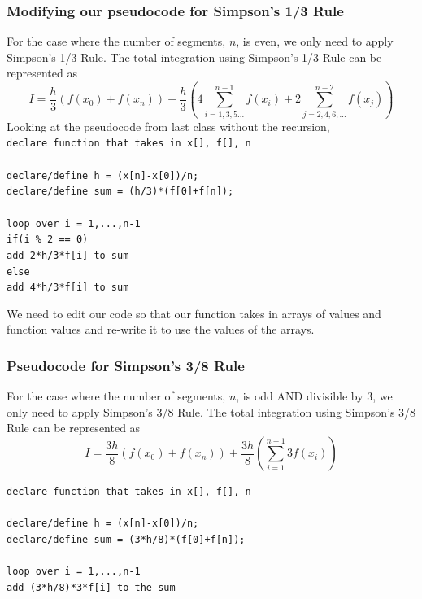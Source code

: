 \documentclass{if-beamer}
\begin{document}
\begin{frame}
	\frametitle{Modifying our pseudocode for Simpson's 1/3 Rule}
	For the case where the number of segments, $n$, is even, we only need to apply Simpson's 1/3 Rule. The total integration using Simpson's 1/3 Rule can be represented as
	$$I = \frac{h}{3}(f(x_0)+f(x_n))+\frac{h}{3}\left( 4\sum_{i = 1,3,5...}^{n-1}f(x_i) + 2\sum_{j = 2,4,6,...}^{n-2} f(x_j) \right)$$
	Looking at the pseudocode from last class without the recursion, \\\vspace{5pt}
	\texttt{declare function that takes in x[], f[], n}\\
	\texttt{ }\\
	\texttt{declare/define h = (x[n]-x[0])/n;}\\
	\texttt{declare/define sum = (h/3)*(f[0]+f[n]);}\\
	\texttt{ }\\
	\texttt{loop over i = 1,...,n-1 }\\
	\texttt{\qquad if(i \% 2 == 0)}\\
	\texttt{\qquad \qquad add 2*h/3*f[i] to sum} \\
	\texttt{\qquad else}\\
	\texttt{\qquad \qquad add 4*h/3*f[i] to sum}
	\texttt{ } \\\vspace{5pt}
	
	We need to edit our code so that our function takes in arrays of  values and function values and re-write it to use the values of the arrays.  
\end{frame}

\begin{frame}
	\frametitle{Pseudocode for Simpson's 3/8 Rule}
	For the case where the number of segments, $n$, is odd AND divisible by 3, we only need to apply Simpson's 3/8 Rule. The total integration using Simpson's 3/8 Rule can be represented as
	$$I = \frac{3h}{8}(f(x_0)+f(x_n))+\frac{3h}{8}\left( \sum_{i = 1}^{n-1}3f(x_i) \right)$$
	
	\texttt{declare function that takes in x[], f[], n}\\
	\texttt{ }\\
	\texttt{declare/define h = (x[n]-x[0])/n;}\\
	\texttt{declare/define sum = (3*h/8)*(f[0]+f[n]);}\\
	\texttt{ }\\
	\texttt{loop over i = 1,...,n-1 }\\
	\texttt{\qquad add (3*h/8)*3*f[i] to the sum}\\
	\texttt{ } \\\vspace{5pt}
	
\end{frame}
\end{document}
